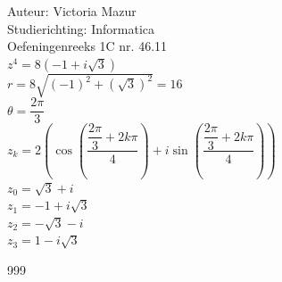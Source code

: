 \documentclass[a4paper]{article}
\begin{document}
\normalsize
\noindent \large Auteur: Victoria Mazur \\
\noindent \large Studierichting: Informatica \\
\noindent \large Oefeningenreeks 1C nr. 46.11 \\

$ z^4 = 8(-1 + i\sqrt{3}) $ \\

$ r = 8\sqrt{(-1)^2 + (\sqrt{3})^2} = 16 $ \\

$ \theta = \dfrac{2\pi}{3} $ \\

$ z_k = 2 \left( \cos\left(\dfrac{\dfrac{2\pi}{3} + 2k\pi}{4}\right) + i\sin\left(\dfrac{\dfrac{2\pi}{3} + 2k\pi}{4}\right) \right) $ \\

$ z_0 = \sqrt{3} + i $ \\

$ z_1 = -1 + i\sqrt{3} $ \\

$ z_2 = -\sqrt{3} - i $ \\

$ z_3 = 1 - i\sqrt{3} $ \\

\begin{thebibliography}{999}
\end{thebibliography}
\end{document}
